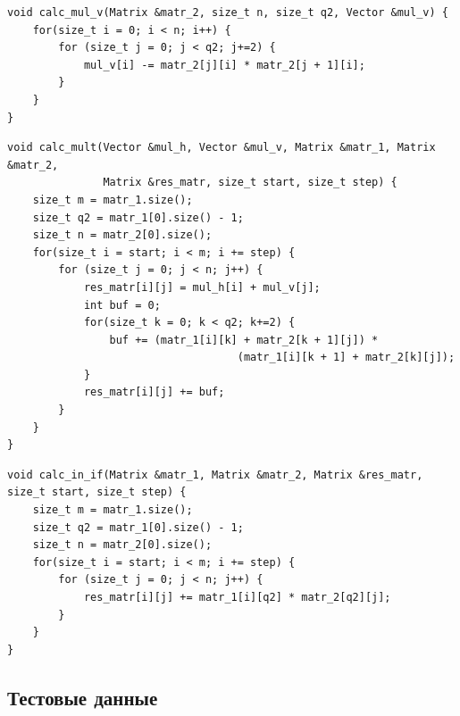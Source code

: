 \documentclass[a4paper,14pt]{article}
\begin{document}
     
	\begin{lstlisting}[label=code_v, caption={Функция вычисления вертикальных произведений}]
void calc_mul_v(Matrix &matr_2, size_t n, size_t q2, Vector &mul_v) {
    for(size_t i = 0; i < n; i++) {
        for (size_t j = 0; j < q2; j+=2) {
            mul_v[i] -= matr_2[j][i] * matr_2[j + 1][i];
        }
    }
}

\end{lstlisting}


	\begin{lstlisting}[label=code_m, caption={Функция вычислений в тройном цикле}]
void calc_mult(Vector &mul_h, Vector &mul_v, Matrix &matr_1, Matrix &matr_2,
               Matrix &res_matr, size_t start, size_t step) {
    size_t m = matr_1.size();
    size_t q2 = matr_1[0].size() - 1;
    size_t n = matr_2[0].size();
    for(size_t i = start; i < m; i += step) {
        for (size_t j = 0; j < n; j++) {
            res_matr[i][j] = mul_h[i] + mul_v[j];
            int buf = 0;
            for(size_t k = 0; k < q2; k+=2) {
                buf += (matr_1[i][k] + matr_2[k + 1][j]) *
                                    (matr_1[i][k + 1] + matr_2[k][j]);
            }
            res_matr[i][j] += buf;
        }
    }
}

    \end{lstlisting}  
    
    
	\begin{lstlisting}[label=code_if, caption={Функция дополнительных вычислений для матриц нечетной размерности }]
	void calc_in_if(Matrix &matr_1, Matrix &matr_2, Matrix &res_matr, 											size_t start, size_t step) {
    size_t m = matr_1.size();
    size_t q2 = matr_1[0].size() - 1;
    size_t n = matr_2[0].size();
    for(size_t i = start; i < m; i += step) {
        for (size_t j = 0; j < n; j++) {
            res_matr[i][j] += matr_1[i][q2] * matr_2[q2][j];
        }
    }
}
	\end{lstlisting}  
	

    
%    
    \subsection{Тестовые данные}
    \label{fig:test_data}
\end{document}

